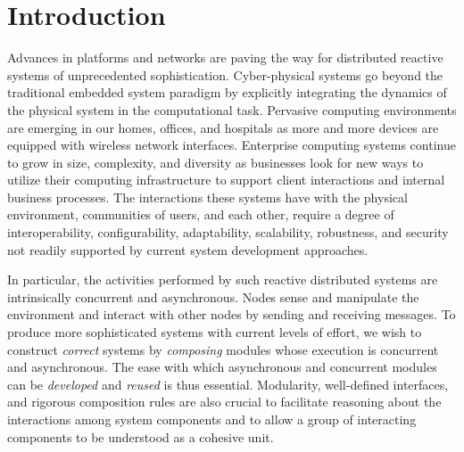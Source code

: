 \section{Introduction\label{introduction}}

Advances in platforms and networks are paving the way for distributed reactive systems of unprecedented sophistication.
Cyber-physical systems go beyond the traditional embedded system paradigm by explicitly integrating the dynamics of the physical system in the computational task.
Pervasive computing environments are emerging in our homes, offices, and hospitals as more and more devices are equipped with wireless network interfaces.
Enterprise computing systems continue to grow in size, complexity, and diversity as businesses look for new ways to utilize their computing infrastructure to support client interactions and internal business processes.
The interactions these systems have with the physical environment, communities of users, and each other, require a degree of interoperability, configurability, adaptability, scalability, robustness, and security not readily supported by current system development approaches.

In particular, the activities performed by such reactive distributed systems are intrinsically concurrent and asynchronous.
Nodes sense and manipulate the environment and interact with other nodes by sending and receiving messages.
To produce more sophisticated systems with current levels of effort, we wish to construct \emph{correct} systems by \emph{composing} modules whose execution is concurrent and asynchronous.
The ease with which asynchronous and concurrent modules can be \emph{developed} and \emph{reused} is thus essential.
Modularity, well-defined interfaces, and rigorous composition rules are also crucial to facilitate reasoning about the interactions among system components and to allow a group of interacting components to be understood as a cohesive unit.

